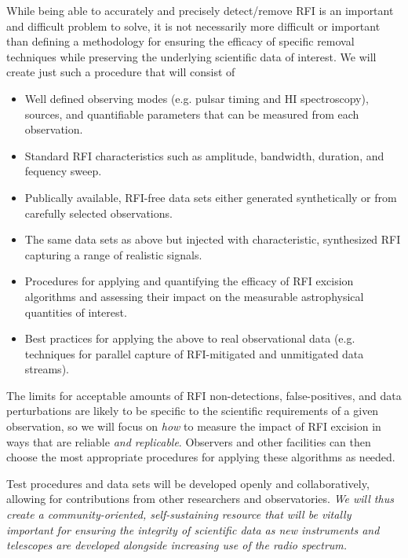 \documentclass[10pt]{myNSF}
\begin{document}
While being able to accurately and precisely detect/remove RFI is an
important and difficult problem to solve, it is not necessarily more
difficult or important than defining a methodology for ensuring the
efficacy of specific removal techniques while preserving the
underlying scientific data of interest.  We will create just such a
procedure that will consist of
\begin{itemize}
\item{Well defined observing modes (e.g. pulsar timing and H{\sc I}
    spectroscopy), sources, and quantifiable parameters that can be
    measured from each observation.}
\item{Standard RFI characteristics such as amplitude, bandwidth,
    duration, and fequency sweep.}
\item{Publically available, RFI-free data sets either generated
    synthetically or from carefully selected observations.}
\item{The same data sets as above but injected with characteristic,
    synthesized RFI capturing a range of realistic signals.}
\item{Procedures for applying and quantifying the efficacy of RFI
    excision algorithms and assessing their impact on the measurable
    astrophysical quantities of interest.}
\item{Best practices for applying the above to real observational data
    (e.g. techniques for parallel capture of RFI-mitigated and
    unmitigated data streams).}
\end{itemize}

The limits for acceptable amounts of RFI non-detections,
false-positives, and data perturbations are likely to be specific to
the scientific requirements of a given observation, so we will focus
on \emph{how} to measure the impact of RFI excision in ways that are
reliable \emph{and replicable}.  Observers and other facilities can
then choose the most appropriate procedures for applying these
algorithms as needed.

Test procedures and data sets will be developed openly and
collaboratively, allowing for contributions from other researchers and
observatories.  \emph{We will thus create a community-oriented,
  self-sustaining resource that will be vitally important for ensuring
  the integrity of scientific data as new instruments and telescopes
  are developed alongside increasing use of the radio spectrum.}

\end{document}
